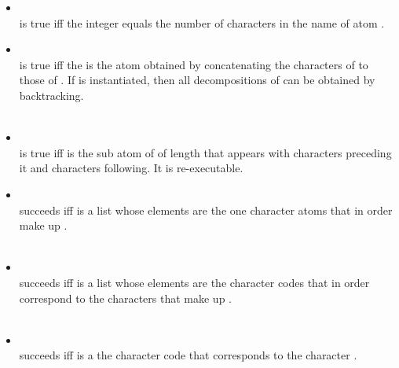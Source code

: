 \begin{itemize}
%
\item {}\\
\noindent{} is true iff the integer
 equals the number of characters in the name of atom
.\\
%
\item {}\\
\noindent{} is true iff the
 is the atom obtained by concatenating the characters of
 to those of . If  is instantiated, then
all decompositions of  can be obtained by backtracking.\\
\\
%
\item {}\\
\noindent{} is
true iff  is the sub atom of  of length
 that appears with  characters preceding it
and  characters following. It is re-executable.\\
%
\item {}\\
\noindent{} succeeds iff  is a
list whose elements are the one character atoms that in order make
up .\\
\\
%
\item {}\\
\noindent{} succeeds iff  is a
list whose elements are the character codes that in order correspond
to the characters that make up .\\
\\
%
\item {}\\
\noindent{} succeeds iff  is a
the character code that corresponds to the character .\\
\\

\end{itemize}
